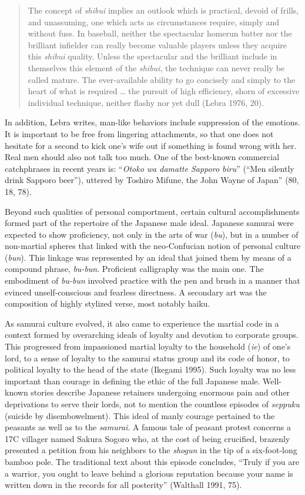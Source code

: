 \begin{quote}
The concept of \emph{shibui} implies an outlook which is practical, devoid of frills, and unassuming, one which acts as circumstances require, simply and without fuss. In baseball, neither the spectacular homerun batter nor the brilliant infielder can really become valuable players unless they acquire this \emph{shibui} quality. Unless the spectacular and the brilliant include in themselves this element of the \emph{shibui}, the technique can never really be called mature. The ever-available ability to go concisely and simply to the heart of what is required \ldots{} the pursuit of high efficiency, shorn of excessive individual technique, neither flashy nor yet dull (Lebra 1976, 20).
\end{quote}

In addition, Lebra writes, man-like behaviors include suppression of the emotions. It is important to be free from lingering attachments, so that one does not hesitate for a second to kick one's wife out if something is found wrong with her. Real men should also not talk too much. One of the best-known commercial catchphrases in recent years is: ``\emph{Otoko wa damatte Sapporo biru}'' (``Men silently drink Sapporo beer''), uttered by Toshiro Mifune, the John Wayne of Japan'' (80, 18, 78).

Beyond such qualities of personal comportment, certain cultural accomplishments formed part of the repertoire of the Japanese male ideal. Japanese samurai were expected to show proficiency, not only in the arts of war (\emph{bu}), but in a number of non-martial spheres that linked with the neo-Confucian notion of personal culture (\emph{bun}). This linkage was represented by an ideal that joined them by means of a compound phrase, \emph{bu-bun}. Proficient calligraphy was the main one. The embodiment of \emph{bu-bun} involved practice with the pen and brush in a manner that evinced unself-conscious and fearless directness. A secondary art was the composition of highly stylized verse, most notably haiku. 

As samurai culture evolved, it also came to experience the martial code in a context formed by overarching ideals of loyalty and devotion to corporate groups. This progressed from impassioned martial loyalty to the household (\emph{ie}) of one's lord, to a sense of loyalty to the samurai status group and its code of honor, to political loyalty to the head of the state (Ikegami 1995). Such loyalty was no less important than courage in defining the ethic of the full Japanese male. Well-known stories describe Japanese retainers undergoing enormous pain and other deprivations to serve their lords, not to mention the countless episodes of \emph{seppuku} (suicide by disembowelment). This ideal of manly courage pertained to the peasants as well as to the \emph{samurai}. A famous tale of peasant protest concerns a 17C villager named Sakura Sogoro who, at the cost of being crucified, brazenly presented a petition from his neighbors to the \emph{shogun} in the tip of a six-foot-long bamboo pole. The traditional text about this episode concludes, ``Truly if you are a warrior, you ought to leave behind a glorious reputation because your name is written down in the records for all posterity'' (Walthall 1991, 75). 

